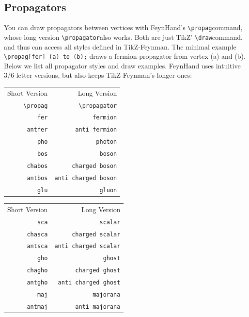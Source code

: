 \documentclass[10pt,letterpaper,twoside,notitlepage]{article}
\numberwithin{figure}{section}
\begin{document}
\subsection{Propagators}
\label{sec:_feynmandiagrams_propagators}
%
\noindent
You can draw propagators between vertices with FeynHand's \vercol\verb$\propag$\txcol command,
whose long version \vercol\verb$\propagator$\txcol also works.
Both are just TikZ' \vercol\verb$\draw$\txcol command, 
and thus can access all styles defined in TikZ-Feynman.
The minimal example \vercol\verb$\propag[fer] (a) to (b);$\txcol
draws a fermion propagator from vertex (a) and (b).
Below we list all propagator styles and draw examples.
FeynHand uses intuitive 3/6-letter versions, but also keeps TikZ-Feynman's longer ones:
%
\setlength{\extrarowheight}{3pt}
\begin{table}[H]
	\centering
	\begin{tabular}{r>{\qquad} r}
		\hline
		Short Version & Long Version
			\\
		\hhline{==}
		\verb$\propag$ & \verb$\propagator$\\
		\hline
		\verb$fer$ & \verb$fermion$\\
		\verb$antfer$ & \verb$anti fermion$\\
		\hline
		\verb$pho$ & \verb$photon$\\
		\hline
		\verb$bos$ & \verb$boson$\\
		\verb$chabos$ & \verb$charged boson$\\
		\verb$antbos$ & \verb$anti charged boson$\\
		\hline
		\verb$glu$ & \verb$gluon$\\
		\hline
	\end{tabular}
	\qquad\qquad\qquad
	\begin{tabular}{r>{\qquad} r}
		\hline
		Short Version & Long Version
			\\
		\hhline{==}
		\verb$sca$ & \verb$scalar$\\
		\verb$chasca$ & \verb$charged scalar$\\
		\verb$antsca$ & \verb$anti charged scalar$\\
		\hline
		\verb$gho$ & \verb$ghost$\\
		\verb$chagho$ & \verb$charged ghost$\\
		\verb$antgho$ & \verb$anti charged ghost$\\
		\hline
		\verb$maj$ & \verb$majorana$\\
		\verb$antmaj$ & \verb$anti majorana$\\
		\hline
	\end{tabular}
\end{table}
%
%
\end{document}
